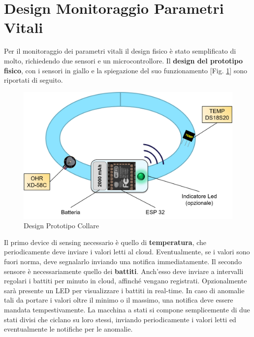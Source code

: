 \section{Design Monitoraggio Parametri Vitali}
Per il monitoraggio dei parametri vitali il design fisico è stato semplificato di molto, richiedendo due sensori e un microcontrollore. Il \textbf{design del prototipo fisico}, con i sensori in giallo e la spiegazione del suo funzionamento [Fig. \ref{fig:collare}] sono riportati di seguito.
    \begin{figure}[H]
        \caption{Design Prototipo Collare}
        \label{fig:collare}
        \centering
        \includegraphics[width=1\textwidth]{Images/collare.png}
    \end{figure}
Il primo device di sensing necessario è quello di \textbf{temperatura}, che periodicamente deve inviare i valori letti al cloud. Eventualmente, se i valori sono fuori norma, deve segnalarlo inviando una notifica immediatamente.
Il secondo sensore è necessariamente quello dei \textbf{battiti}. Anch'esso deve inviare a intervalli regolari i battiti per minuto in cloud, affinché vengano registrati. Opzionalmente sarà presente un LED per visualizzare i battiti in real-time. In caso di anomalie tali da portare i valori oltre il minimo o il massimo, una notifica deve essere mandata tempestivamente. 
La macchina a stati si compone semplicemente di due stati divisi che ciclano su loro stessi, inviando periodicamente i valori letti ed eventualmente le notifiche per le anomalie.
    
